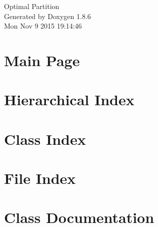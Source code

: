 \documentclass[twoside]{book}
\newcommand{\clearemptydoublepage}{%
  \newpage{\pagestyle{empty}\cleardoublepage}%
}
\begin{document}
\hypersetup{pageanchor=false}
\begin{titlepage}
\vspace*{7cm}
\begin{center}%
{\Large Optimal Partition }\\
\vspace*{1cm}
{\large Generated by Doxygen 1.8.6}\\
\vspace*{0.5cm}
{\small Mon Nov 9 2015 19:14:46}\\
\end{center}
\end{titlepage}
\clearemptydoublepage
\tableofcontents
\clearemptydoublepage
{}
\hypersetup{pageanchor=true}

\chapter{Main Page}
\label{index}\hypertarget{index}{}
\chapter{Hierarchical Index}

\chapter{Class Index}

\chapter{File Index}

\chapter{Class Documentation}














































\end{document}
